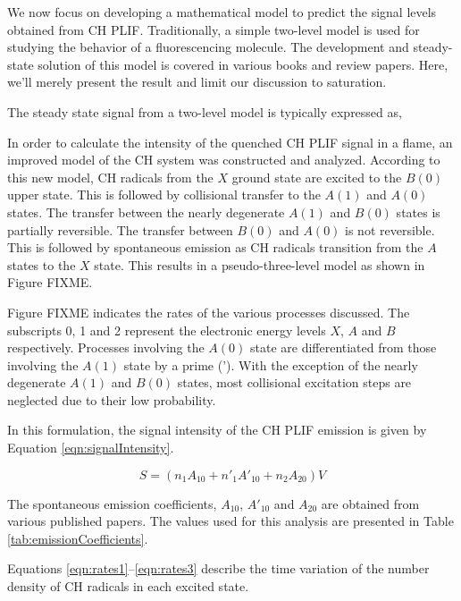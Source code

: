 We now focus on developing a mathematical model to predict the signal levels obtained from CH PLIF.
Traditionally, a simple two-level model is used for studying the behavior of a fluorescencing molecule.
The development and steady-state solution of this model is covered in various books and review papers.\cite{1997-daily}
Here, we'll merely present the result and limit our discussion to saturation.

The steady state signal from a two-level model is typically expressed as,






In order to calculate the intensity of the quenched CH PLIF signal in a flame, an improved model of the CH system was constructed and analyzed.
According to this new model, CH radicals from the \(X\) ground state are excited to the \(B(0)\) upper state.
This is followed by collisional transfer to the \(A(1)\) and \(A(0)\) states.
The transfer between the nearly degenerate \(A(1)\) and \(B(0)\) states is partially reversible.
The transfer between \(B(0)\) and \(A(0)\) is not reversible.
This is followed by spontaneous emission as CH radicals transition from the \(A\) states to the \(X\) state.
This results in a pseudo-three-level model as shown in Figure FIXME.

Figure FIXME indicates the rates of the various processes discussed.
The subscripts 0, 1 and 2 represent the electronic energy levels \(X\), \(A\) and \(B\) respectively.
Processes involving the \(A(0)\) state are differentiated from those involving the \(A(1)\) state by a prime (').
With the exception of the nearly degenerate \(A(1)\) and \(B(0)\) states, most collisional excitation steps are neglected due to their low probability.

In this formulation, the signal intensity of the CH PLIF emission is given by Equation \ref{eqn:signalIntensity}.

\begin{equation}
S = ( n_1A_{10} + n'_1A'_{10} + n_2A_{20} )V
\label{eqn:signalIntensity}
\end{equation}

The spontaneous emission coefficients, \(A_{10}\), \(A'_{10}\) and \(A_{20}\) are obtained from various published papers\cite{1985-garland-a,1996-luque-b,2005-richmond}.
The values used for this analysis are presented in Table \ref{tab:emissionCoefficients}.



Equations \ref{eqn:rates1}--\ref{eqn:rates3} describe the time variation of the number density of CH radicals in each excited state.


